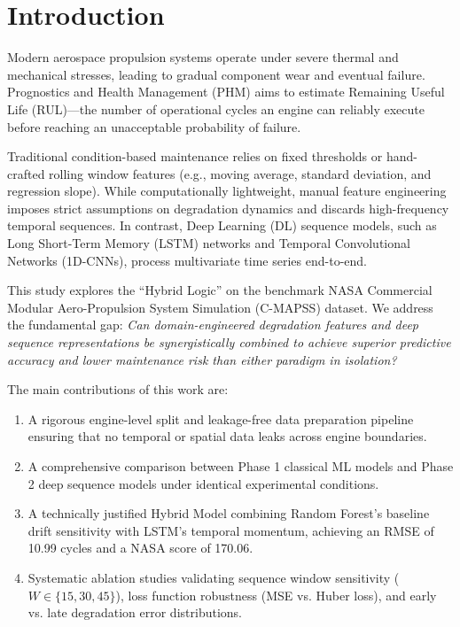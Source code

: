 \documentclass[conference]{IEEEtran}
\begin{document}
\section{Introduction}
Modern aerospace propulsion systems operate under severe thermal and mechanical stresses, leading to gradual component wear and eventual failure. Prognostics and Health Management (PHM) aims to estimate Remaining Useful Life (RUL)---the number of operational cycles an engine can reliably execute before reaching an unacceptable probability of failure.

Traditional condition-based maintenance relies on fixed thresholds or hand-crafted rolling window features (e.g., moving average, standard deviation, and regression slope). While computationally lightweight, manual feature engineering imposes strict assumptions on degradation dynamics and discards high-frequency temporal sequences. In contrast, Deep Learning (DL) sequence models, such as Long Short-Term Memory (LSTM) networks and Temporal Convolutional Networks (1D-CNNs), process multivariate time series end-to-end.

This study explores the ``Hybrid Logic'' on the benchmark NASA Commercial Modular Aero-Propulsion System Simulation (C-MAPSS) dataset. We address the fundamental gap: \textit{Can domain-engineered degradation features and deep sequence representations be synergistically combined to achieve superior predictive accuracy and lower maintenance risk than either paradigm in isolation?}

The main contributions of this work are:
\begin{enumerate}
    \item A rigorous engine-level split and leakage-free data preparation pipeline ensuring that no temporal or spatial data leaks across engine boundaries.
    \item A comprehensive comparison between Phase 1 classical ML models and Phase 2 deep sequence models under identical experimental conditions.
    \item A technically justified Hybrid Model combining Random Forest's baseline drift sensitivity with LSTM's temporal momentum, achieving an RMSE of 10.99 cycles and a NASA score of 170.06.
    \item Systematic ablation studies validating sequence window sensitivity ($W \in \{15, 30, 45\}$), loss function robustness (MSE vs. Huber loss), and early vs. late degradation error distributions.
\end{enumerate}
\end{document}
